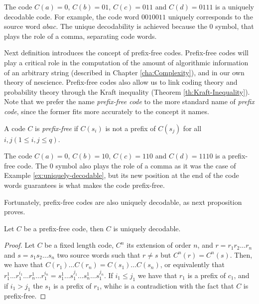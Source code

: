 \begin{example}
\label{ex:uniquely-decodable}
The code $C(a)=0$, $C(b)=01$, $C(c)=011$ and $C(d)=0111$ is a uniquely decodable code. For example, the code word $0010011$ uniquely corresponds to the source word $abac$. The unique decodability is achieved because the $0$ symbol, that plays the role of a comma, separating code words.
\end{example}

Next definition introduces the concept of prefix-free codes. Prefix-free codes will play a critical role in the computation of the amount of algorithmic information of an arbitrary string (described in Chapter \ref{cha:Complexity}), and in our own theory of nescience. Prefix-free codes also allow us to link coding theory and probability theory through the Kraft inequality (Theorem \ref{th:Kraft-Inequality}). Note that we prefer the name \emph{prefix-free code} to the more standard name of \emph{prefix code}, since the former fits more accurately to the concept it names.

\begin{definition}
\label{def:Prefix-free-Code}
A code $C$ is \emph{prefix-free} if $C(s_{i})$ is not a prefix of $C(s_{j})$ for all $i,j\left(1\leq i,j\leq q\right)$.
\end{definition}

\begin{example}
\label{ex:prefix-free}
The code $C(a)=0$, $C(b)=10$, $C(c)=110$ and $C(d)=1110$ is a prefix-free code. The $0$ symbol also plays the role of a comma as it was the case of Example \ref{ex:uniquely-decodable}, but its new position at the end of the code words guarantees is what makes the code prefix-free.
\end{example}

Fortunately, prefix-free codes are also uniquely decodable, as next proposition proves.

\begin{proposition}
Let $C$ be a prefix-free code, then $C$ is uniquely decodable.
\end{proposition}
\begin{proof}
Let $C$ be a fixed length code, $C^n$ its extension of order $n$, and $r = r_1 r_2 \ldots r_n$ and $s = s_1 s_2 \ldots s_n$ two source words such that $r \ne s$ but $C^n(r) = C^n(s)$. Then, we have that $C(r_1) \ldots C(r_n) = C(s_1) \ldots C(s_n)$, or equivalently that $r_1^1 \ldots r_1^{i_1} \ldots r_n^1 \ldots r_1^{i_n} = s_1^1 \ldots s_1^{j_1} \ldots s_n^1 \ldots s_1^{j_n}$. If $i_1 \leq j_1$ we have that $r_1$ is a prefix of $c_1$, and if $i_1 > j_1$ the $s_1$ is a prefix of $r_1$, whihc is a contradiction with the fact that $C$ is prefix-free.
\end{proof}


